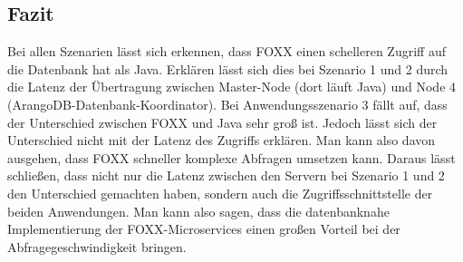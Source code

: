 \subsection{Fazit}
Bei allen Szenarien lässt sich erkennen, dass FOXX einen schelleren Zugriff auf die Datenbank hat als Java. Erklären lässt sich dies bei Szenario 1 und 2 durch die Latenz der Übertragung zwischen Master-Node (dort läuft Java) und Node 4 (ArangoDB-Datenbank-Koordinator). \newline
Bei Anwendungsszenario 3 fällt auf, dass der Unterschied zwischen FOXX und Java sehr groß ist. Jedoch lässt sich der Unterschied nicht mit der Latenz des Zugriffs erklären. Man kann also davon ausgehen, dass FOXX schneller komplexe Abfragen umsetzen kann. \newline
Daraus lässt schließen, dass nicht nur die Latenz zwischen den Servern bei Szenario 1 und 2 den Unterschied gemachten haben, sondern auch die Zugriffsschnittstelle der beiden Anwendungen. Man kann also sagen, dass die datenbanknahe Implementierung der FOXX-Microservices einen großen Vorteil bei der Abfragegeschwindigkeit bringen.